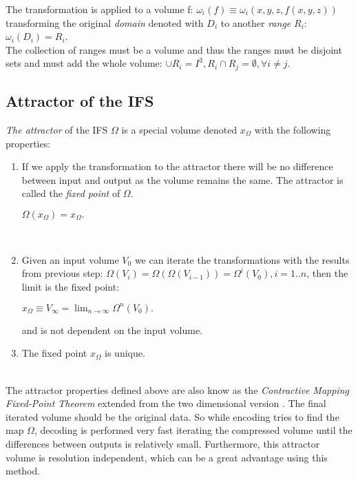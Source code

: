 \documentclass[10pt, conference, compsocconf]{IEEEtran}
\begin{document}
The transformation is applied to a volume f: $\omega_i(f) \equiv \omega_i(x,y,z,f(x,y,z))$ transforming the original \emph{domain} denoted with $D_i$ to another \emph{range} $R_i$: $\omega_i(D_i)=R_i$.~\\

The collection of ranges must be a volume and thus the ranges must be disjoint sets and must add the whole volume:
$\cup R_i = I^3, R_i \cap R_j = \emptyset, \forall i \neq j$.~\\

\subsection{Attractor of the IFS}

\emph{The attractor} of the IFS $\Omega$ is a special volume denoted $x_\Omega$ with the following properties: ~\\

\begin{enumerate}
\item{If we apply the transformation to the attractor there will be no difference between input and output as the volume remains the same. The attractor is called the \emph{fixed point} of $\Omega$. ~\\
\begin{center}
$\Omega(x_\Omega) = x_\Omega.$
\end{center}
} ~\\
\item{Given an input volume $V_0$ we can iterate the transformations with the results from previous step: $\Omega(V_i)=\Omega(\Omega(V_{i-1}))=\Omega^i(V_0), i =1..n$, then the limit is the fixed point: ~\\
\begin{center}
$\displaystyle x_\Omega \equiv V_\infty = \lim_{n \to \infty}\Omega^n(V_0).$
\end{center}
and is not dependent on the input volume.
}
\item{The fixed point $x_\Omega$ is unique.}
\end{enumerate} ~\\


The attractor properties defined above are also know as the \emph{Contractive Mapping Fixed-Point Theorem} extended from the two dimensional version \cite{Fis95}.
The final iterated volume should be the original data. So while encoding tries to find the map $\Omega$, decoding is performed very fast iterating the compressed volume until the differences between outputs is relatively small. Furthermore, this attractor volume is resolution independent, which can be a great advantage using this method.~\\
\end{document}
